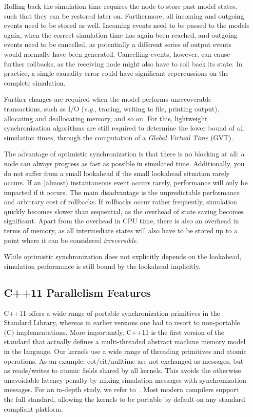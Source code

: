 Rolling back the simulation time requires the node to store past model states, such that they can be restored later on.
Furthermore, all incoming and outgoing events need to be stored as well.
Incoming events need to be passed to the models again, when the correct simulation time has again been reached, and outgoing events need to be cancelled, as potentially a different series of output events would normally have been generated.
Cancelling events, however, can cause further rollbacks, as the receiving node might also have to roll back its state.
In practice, a single causality error could have significant repercussions on the complete simulation.

Further changes are required when the model performs unrecoverable transactions, such as I/O (\textit{e.g.}, tracing, writing to file, printing output), allocating and deallocating memory, and so on.
For this, lightweight synchronization algorithms are still required to determine the lower bound of all simulation times, through the computation of a \textit{Global Virtual Time} (GVT).

The advantage of optimistic synchronization is that there is no blocking at all: a node can always progress as fast as possible in simulated time.
Additionally, you do not suffer from a small lookahead if the small lookahead situation rarely occurs.
If an (almost) instantaneous event occurs rarely, performance will only be impacted if it occurs.
The main disadvantage is the unpredictable performance and arbitrary cost of rollbacks.
If rollbacks occur rather frequently, simulation quickly becomes slower than sequential, as the overhead of state saving becomes significant.
Apart from the overhead in CPU time, there is also an overhead in terms of memory, as all intermediate states will also have to be stored up to a point where it can be considered \textit{irreversible}.

While optimistic synchronization does not explicitly depends on the lookahead, simulation performance is still bound by the lookahead implicitly.

\subsection{C++11 Parallelism Features}
C++11 offers a wide range of portable synchronization primitives in the Standard Library, whereas in earlier versions one had to resort to non-portable (C) implementations. More importantly, C++11 is the first version of the standard that actually defines a multi-threaded abstract machine memory model in the language.
Our kernels use a wide range of threading primitives and atomic operations. As an example, eot/eit/nulltime are not exchanged as messages, but as reads/writes to atomic fields shared by all kernels. This avoids the otherwise unavoidable latency penalty by mixing simulation messages with synchronization messages. For an in-depth study, we refer to~\cite{CPE:CPE3007}.
Most modern compilers support the full standard, allowing the kernels to be portable by default on any standard compliant platform. 

